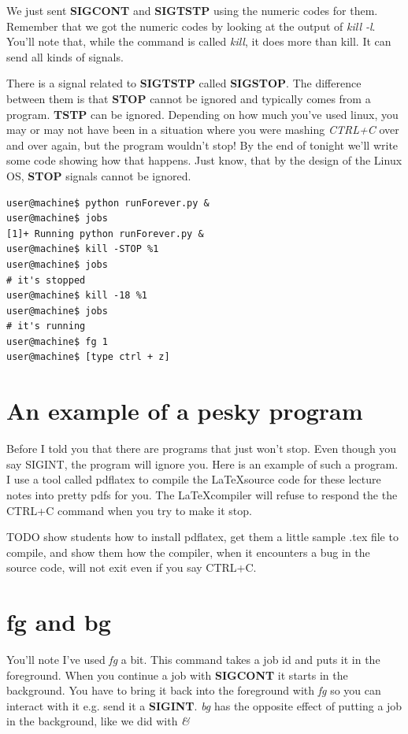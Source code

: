 \documentclass[12pt]{article}
\begin{document}
We just sent \textbf{SIGCONT} and \textbf{SIGTSTP} using the numeric codes for them. Remember that we got the numeric codes by looking at the output of \textit{kill -l}. You'll note that, while the command is called \textit{kill}, it does more than kill. It can send all kinds of signals.

There is a signal related to \textbf{SIGTSTP} called \textbf{SIGSTOP}.
The difference between them is that \textbf{STOP} cannot be ignored and typically comes from a program. \textbf{TSTP} can be ignored. Depending on how much you've used linux, you may or may  not have been in a situation where you were mashing \textit{CTRL+C} over and over again, but the program wouldn't stop! By the end of tonight we'll write some code showing how that happens. Just know, that by the design of the Linux OS, \textbf{STOP} signals cannot be ignored.

\begin{lstlisting}
user@machine$ python runForever.py &
user@machine$ jobs
[1]+ Running python runForever.py &
user@machine$ kill -STOP %1
user@machine$ jobs
# it's stopped
user@machine$ kill -18 %1
user@machine$ jobs 
# it's running
user@machine$ fg 1
user@machine$ [type ctrl + z]
\end{lstlisting}

\section{An example of a pesky program}
Before I told you that there are programs that just won't stop. Even though you
say SIGINT, the program will ignore you. Here is an example of such a program. I
use a tool called pdflatex to compile the \LaTeX source code for these lecture
notes into pretty pdfs for you. The \LaTeX compiler will refuse to respond the
the CTRL+C command when you try to make it stop.

TODO show students how to install pdflatex, get them a little sample .tex file
to compile, and show them how the compiler, when it encounters a bug in the
source code, will not exit even if you say CTRL+C.

\section{fg and bg}
You'll note I've used \textit{fg} a bit. This command takes a job id and puts it in the foreground. When you continue a job with \textbf{SIGCONT} it starts in the background. You have to bring it back into the foreground with \textit{fg} so you can interact with it e.g. send it a \textbf{SIGINT}. \textit{bg} has the opposite effect of putting a job in the background, like we did with \textit{\&}
\end{document}
